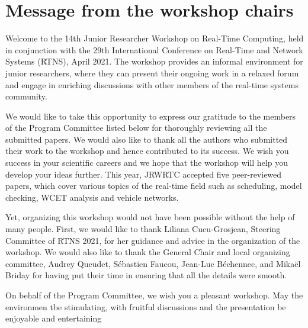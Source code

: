 \documentclass[10pt]{article}
\begin{document}



\newpage



\section*{Message from the workshop chairs}


Welcome to the 14th Junior Researcher Workshop on Real-Time Computing, held in 
conjunction with the 29th International Conference on Real-Time and Network 
Systems (RTNS), April 2021. The workshop provides an informal 
environment for junior researchers, where they can present their ongoing work 
in a relaxed forum and engage in enriching discussions with other members of 
the real-time systems community.

We would like to take this opportunity to express our gratitude to the members 
of the Program Committee listed below for thoroughly reviewing all the 
submitted papers.  We would also like to thank all the authors who submitted 
their work to the workshop and hence contributed to its success.  We wish you 
success in your scientific careers and we hope that the workshop will help you 
develop your ideas further. This year, JRWRTC accepted five peer-reviewed 
papers,  which cover various topics of the real-time field such as scheduling, 
model checking, WCET analysis and vehicle networks. 


Yet, organizing this workshop would not have been possible 
without the help of many people. First,  we would like to thank Liliana 
Cucu-Grosjean, Steering Committee of RTNS 2021, for her guidance and advice in 
the organization of the workshop. We would also 
like to thank the General Chair and local organizing committee, 
Audrey Queudet, Sébastien Faucou, Jean-Luc Béchennec, and Mikaël Briday for 
having put their time in ensuring that all the details were smooth.


On behalf of the 
Program Committee, we wish you a pleasant workshop. May the environmen tbe 
stimulating, with fruitful discussions and the presentation be enjoyable and 
entertaining
\end{document}

